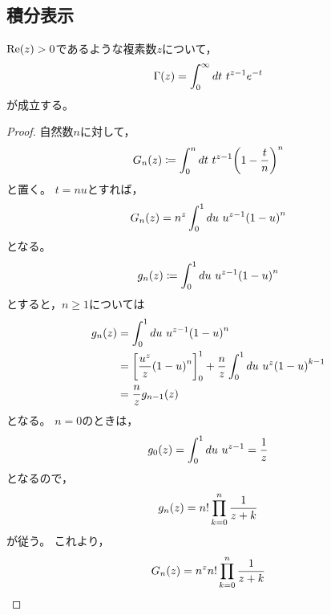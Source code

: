 \documentclass[a4paper,draft]{ltjsarticle}
\begin{document}
\subsection{積分表示}
\begin{thm}\label{thm:Gamma-積分表示}
    $\re{z}>0$であるような複素数$z$について，
    \begin{equation}
        \fun{\Gamma}{z}=\int_0^\infty dt\ t^{z-1}e^{-t}
    \end{equation}
    が成立する。
    \begin{proof}
        自然数$n$に対して，
        \begin{equation}
            \fun{G_n}{z}\coloneqq \int_0^n dt\ t^{z-1}\pare{1-\dfrac{t}{n}}^n
        \end{equation}
        と置く。
        $t=nu$とすれば，
        \begin{equation}
            \fun{G_n}{z}=n^z\int_0^1 du\ u^{z-1} \pare{1-u}^n 
        \end{equation}
        となる。
        \begin{equation}
            \fun{g_n}{z}\coloneqq \int_0^1 du\ u^{z-1} \pare{1-u}^n 
        \end{equation}
        とすると，$n\geq 1$については
        \begin{align}
            \fun{g_n}{z}&=\int_0^1 du\ u^{z-1}\pare{1-u}^n
            \\
            &=\squ{\dfrac{u^z}{z}\pare{1-u}^n}_0^1
            + \dfrac{n}{z} \int_0^1 du\ u^z\pare{1-u}^{k-1}
            \\
            &=\dfrac{n}{z}\fun{g_{n-1}}{z}
        \end{align}
        となる。
        $n=0$のときは，
        \begin{equation}
            \fun{g_0}{z}=\int_0^1du\ u^{z-1}=\dfrac{1}{z}
        \end{equation}
        となるので，
        \begin{equation}
            \fun{g_n}{z}=n!\prod_{k=0}^n\dfrac{1}{z+k}
        \end{equation}
        が従う。
        これより，
        \begin{equation}
            \fun{G_n}{z}=n^zn!\prod_{k=0}^n\dfrac{1}{z+k}
        \end{equation}

\end{proof}
\end{thm}
\end{document}
